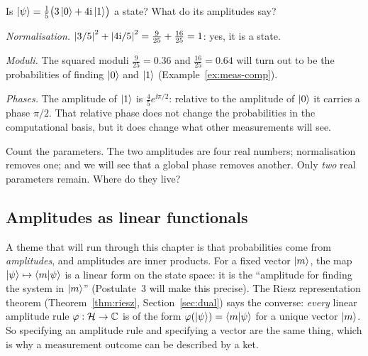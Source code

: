 \begin{example}\label{ex:read-amplitudes}
  Is $\left|\psi\right\rangle=\tfrac15\bigl(3\left|0\right\rangle+4\mathrm{i}\left|1\right\rangle\bigr)$ a state? What do its amplitudes say?
\end{example}
\begin{solution}
  \begin{steps}
    \item \emph{Normalisation.} $\left|3/5\right|^2+\left|4\mathrm{i}/5\right|^2=\tfrac{9}{25}+\tfrac{16}{25}=1$: yes, it is a state.
    \item \emph{Moduli.} The squared moduli $\tfrac9{25}=0.36$ and $\tfrac{16}{25}=0.64$ will turn out to be the probabilities of finding $\left|0\right\rangle$ and $\left|1\right\rangle$ (Example~\ref{ex:meas-comp}).
    \item \emph{Phases.} The amplitude of $\left|1\right\rangle$ is $\tfrac45e^{\ii\pi/2}$: relative to the amplitude of $\left|0\right\rangle$ it carries a phase $\pi/2$. That relative phase does not change the probabilities in the computational basis, but it does change what other measurements will see.
  \end{steps}
\end{solution}

Count the parameters. The two amplitudes are four real numbers; normalisation removes one; and we will see that a global phase removes another. Only \emph{two} real parameters remain. Where do they live?

\subsection{Amplitudes as linear functionals}

A theme that will run through this chapter is that probabilities come from \emph{amplitudes}, and amplitudes are inner products. For a fixed vector $\left|m\right\rangle$, the map $\left|\psi\right\rangle\mapsto\left\langle m\middle|\psi\right\rangle$ is a linear form on the state space: it is the ``amplitude for finding the system in $\left|m\right\rangle$'' (Postulate~3 will make this precise). The Riesz representation theorem (Theorem~\ref{thm:riesz}, Section~\ref{sec:dual}) says the converse: \emph{every} linear amplitude rule $\varphi:\mathcal{H}\to\mathbb{C}$ is of the form $\varphi(\left|\psi\right\rangle)=\left\langle m\middle|\psi\right\rangle$ for a unique vector $\left|m\right\rangle$. So specifying an amplitude rule and specifying a vector are the same thing, which is why a measurement outcome can be described by a ket.

